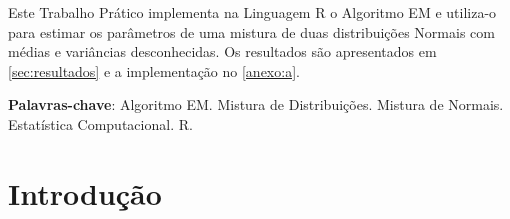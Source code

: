 \documentclass[
	article,			%
	11pt,				%
	oneside,			%
	a4paper,			%
	english,			%
	brazil,				%
	sumario=tradicional
	]{abntex2}
\begin{document}

\frenchspacing 


%
%
\maketitle

\begin{resumoumacoluna}
Este Trabalho Prático implementa na Linguagem R o Algoritmo EM e utiliza-o para estimar os parâmetros de uma mistura de duas distribuições Normais com médias e variâncias desconhecidas. Os resultados são apresentados em \ref{sec:resultados} e a implementação no \ref{anexo:a}.
 
 \vspace{\onelineskip}
 
 \noindent
 \textbf{Palavras-chave}: Algoritmo EM. Mistura de Distribuições. Mistura de Normais. Estatística Computacional. R.
\end{resumoumacoluna}


\textual

\section{Introdução}
\end{document}
